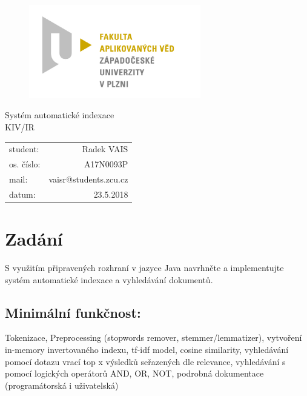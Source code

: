 \documentclass[12pt, a4paper]{article}
\begin{document}
\begin{figure}[h!]
\centering
\includegraphics[bb= 0 0 820 445 , width=75mm]{favlogo.jpg}
\end{figure}

{\centering
{\huge Systém automatické indexace}\\[1em]
{\large KIV/IR}\\[11,5cm]
}

\begin{tabular}{l r}
student: & Radek VAIS\\
os. číslo: & A17N0093P\\
mail: & vaisr@students.zcu.cz\\
datum: & 23.5.2018\\
\end{tabular}

\thispagestyle{empty}
\newpage

\section{Zadání} %

S využitím připravených rozhraní v jazyce Java navrhněte a implementujte systém automatické indexace a vyhledávání dokumentů.

\subsection{Minimální funkčnost:}

Tokenizace, Preprocessing (stopwords remover, stemmer/lemmatizer), vytvoření in-memory invertovaného indexu, tf-idf model, cosine similarity,  vyhledávání pomocí dotazu vrací top x výsledků seřazených dle relevance, vyhledávání s pomocí logických operátorů AND, OR, NOT, podrobná dokumentace (programátorská i uživatelská)
\end{document}
